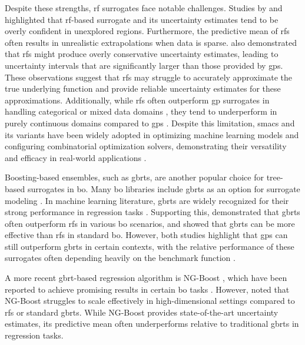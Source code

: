 Despite these strengths, \ac{rf} surrogates face notable challenges. Studies by \citet{nickson2014automated} and \citet{shahriari2015taking} highlighted that \ac{rf}-based surrogate and its uncertainty estimates tend to be overly confident in unexplored regions. Furthermore, the predictive mean of \acp{rf} often results in unrealistic extrapolations when data is sparse. 
\citet{lim2021extrapolative} also demonstrated that \acp{rf} might produce overly conservative uncertainty estimates, leading to uncertainty intervals that are significantly larger than those provided by \acp{gp}. These observations suggest that \acp{rf} may struggle to accurately approximate the true underlying function and provide reliable uncertainty estimates for these approximations. Additionally, while \acp{rf} often outperform \ac{gp} surrogates in handling categorical or mixed data domains \citep{hutter2011sequential, hutter2013evaluation}, they tend to underperform in purely continuous domains compared to \acp{gp} \citep{hutter2013evaluation}. Despite this limitation, \acp{smac} and its variants have been widely adopted in optimizing machine learning models and configuring combinatorial optimization solvers, demonstrating their versatility and efficacy in real-world applications \citep{feurer2019hyperparameter}.

Boosting-based ensembles, such as \acp{gbrt}, are another popular choice for tree-based surrogates in \ac{bo}. Many \ac{bo} libraries include \acp{gbrt} as an option for surrogate modeling \citep{thebelt2021entmoot}. In machine learning literature, \acp{gbrt} are widely recognized for their strong performance in regression tasks \citep{nielsen2016tree}. Supporting this, \citet{thebelt2021entmoot} demonstrated that \acp{gbrt} often outperform \acp{rf} in various \ac{bo} scenarios, and \citep{lim2021extrapolative} showed that \acp{gbrt} can be more effective than \acp{rf} in standard \ac{bo}. However, both studies highlight that \acp{gp} can still outperform \acp{gbrt} in certain contexts, with the relative performance of these surrogates often depending heavily on the benchmark function \citep{kim2022uncertainty}. 

A more recent \ac{gbrt}-based regression algorithm is NG-Boost \citep{duan2020ngboost}, which have been reported to achieve promising results in certain \ac{bo} tasks \citep{duan2020ngboost,kim2022uncertainty}. However, \citet{kim2022uncertainty} noted that NG-Boost struggles to scale effectively in high-dimensional settings compared to \acp{rf} or standard \acp{gbrt}. While NG-Boost provides state-of-the-art uncertainty estimates, its predictive mean often underperforms relative to traditional \acp{gbrt} in regression tasks.

